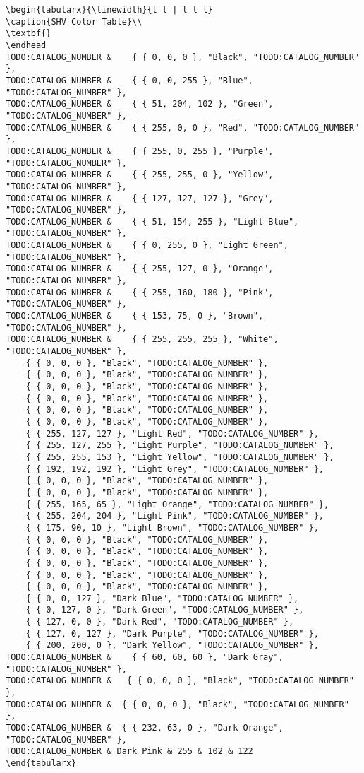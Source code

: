 \documentclass[onesize, a4paper]{refart}
\begin{document}
\begin{verbatim}
\begin{tabularx}{\linewidth}{l l | l l l}
\caption{SHV Color Table}\\
\textbf{}
\endhead
TODO:CATALOG_NUMBER &    { { 0, 0, 0 }, "Black", "TODO:CATALOG_NUMBER" },
TODO:CATALOG_NUMBER &    { { 0, 0, 255 }, "Blue", "TODO:CATALOG_NUMBER" },
TODO:CATALOG_NUMBER &    { { 51, 204, 102 }, "Green", "TODO:CATALOG_NUMBER" },
TODO:CATALOG_NUMBER &    { { 255, 0, 0 }, "Red", "TODO:CATALOG_NUMBER" },
TODO:CATALOG_NUMBER &    { { 255, 0, 255 }, "Purple", "TODO:CATALOG_NUMBER" },
TODO:CATALOG_NUMBER &    { { 255, 255, 0 }, "Yellow", "TODO:CATALOG_NUMBER" },
TODO:CATALOG_NUMBER &    { { 127, 127, 127 }, "Grey", "TODO:CATALOG_NUMBER" },
TODO:CATALOG_NUMBER &    { { 51, 154, 255 }, "Light Blue", "TODO:CATALOG_NUMBER" },
TODO:CATALOG_NUMBER &    { { 0, 255, 0 }, "Light Green", "TODO:CATALOG_NUMBER" },
TODO:CATALOG_NUMBER &    { { 255, 127, 0 }, "Orange", "TODO:CATALOG_NUMBER" },
TODO:CATALOG_NUMBER &    { { 255, 160, 180 }, "Pink", "TODO:CATALOG_NUMBER" },
TODO:CATALOG_NUMBER &    { { 153, 75, 0 }, "Brown", "TODO:CATALOG_NUMBER" },
TODO:CATALOG_NUMBER &    { { 255, 255, 255 }, "White", "TODO:CATALOG_NUMBER" },
    { { 0, 0, 0 }, "Black", "TODO:CATALOG_NUMBER" },
    { { 0, 0, 0 }, "Black", "TODO:CATALOG_NUMBER" },
    { { 0, 0, 0 }, "Black", "TODO:CATALOG_NUMBER" },
    { { 0, 0, 0 }, "Black", "TODO:CATALOG_NUMBER" },
    { { 0, 0, 0 }, "Black", "TODO:CATALOG_NUMBER" },
    { { 0, 0, 0 }, "Black", "TODO:CATALOG_NUMBER" },
    { { 255, 127, 127 }, "Light Red", "TODO:CATALOG_NUMBER" },
    { { 255, 127, 255 }, "Light Purple", "TODO:CATALOG_NUMBER" },
    { { 255, 255, 153 }, "Light Yellow", "TODO:CATALOG_NUMBER" },
    { { 192, 192, 192 }, "Light Grey", "TODO:CATALOG_NUMBER" },
    { { 0, 0, 0 }, "Black", "TODO:CATALOG_NUMBER" },
    { { 0, 0, 0 }, "Black", "TODO:CATALOG_NUMBER" },
    { { 255, 165, 65 }, "Light Orange", "TODO:CATALOG_NUMBER" },
    { { 255, 204, 204 }, "Light Pink", "TODO:CATALOG_NUMBER" },
    { { 175, 90, 10 }, "Light Brown", "TODO:CATALOG_NUMBER" },
    { { 0, 0, 0 }, "Black", "TODO:CATALOG_NUMBER" },
    { { 0, 0, 0 }, "Black", "TODO:CATALOG_NUMBER" },
    { { 0, 0, 0 }, "Black", "TODO:CATALOG_NUMBER" },
    { { 0, 0, 0 }, "Black", "TODO:CATALOG_NUMBER" },
    { { 0, 0, 0 }, "Black", "TODO:CATALOG_NUMBER" },
    { { 0, 0, 127 }, "Dark Blue", "TODO:CATALOG_NUMBER" },
    { { 0, 127, 0 }, "Dark Green", "TODO:CATALOG_NUMBER" },
    { { 127, 0, 0 }, "Dark Red", "TODO:CATALOG_NUMBER" },
    { { 127, 0, 127 }, "Dark Purple", "TODO:CATALOG_NUMBER" },
    { { 200, 200, 0 }, "Dark Yellow", "TODO:CATALOG_NUMBER" },
TODO:CATALOG_NUMBER &    { { 60, 60, 60 }, "Dark Gray", "TODO:CATALOG_NUMBER" },
TODO:CATALOG_NUMBER &   { { 0, 0, 0 }, "Black", "TODO:CATALOG_NUMBER" },
TODO:CATALOG_NUMBER &  { { 0, 0, 0 }, "Black", "TODO:CATALOG_NUMBER" },
TODO:CATALOG_NUMBER &  { { 232, 63, 0 }, "Dark Orange", "TODO:CATALOG_NUMBER" },
TODO:CATALOG_NUMBER & Dark Pink & 255 & 102 & 122 
\end{tabularx}

\end{verbatim}
\end{document}
